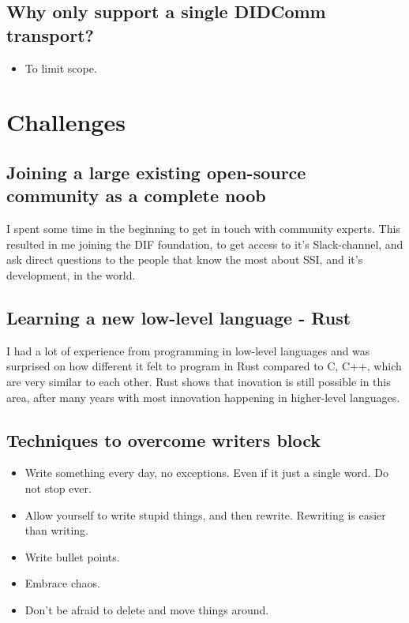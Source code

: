 \subsection{Why only support a single DIDComm transport?}
\begin{itemize}
    \item To limit scope.
\end{itemize}








\section{Challenges}

\subsection{Joining a large existing open-source community as a complete noob}

I spent some time in the beginning to get in touch with community experts. This resulted in me joining the DIF foundation, to get access to it's Slack-channel, and ask direct questions to the people that know the most about SSI, and it's development, in the world.

\subsection{Learning a new low-level language - Rust}

I had a lot of experience from programming in low-level languages and was surprised on how different it felt to program in Rust compared to C, C++, which are very similar to each other. Rust shows that inovation is still possible in this area, after many years with most innovation happening in higher-level languages.

\subsection{Techniques to overcome writers block}
\begin{itemize}
    \item Write something every day, no exceptions. Even if it just a single word. Do not stop ever.
    \item Allow yourself to write stupid things, and then rewrite. Rewriting is easier than writing.
    \item Write bullet points.
    \item Embrace chaos.
    \item Don't be afraid to delete and move things around.
\end{itemize}


